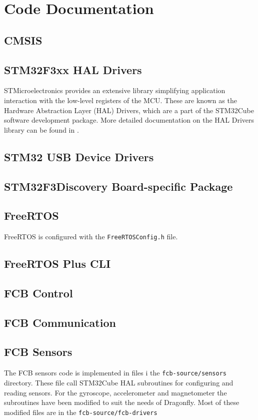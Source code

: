 \documentclass[a4paper]{report}
\begin{document}
	\section{Code Documentation}

		\subsection{CMSIS}

		\subsection{STM32F3xx HAL Drivers}
STMicroelectronics provides an extensive library simplifying application interaction with the low-level registers of the MCU. These are known as the Hardware Abstraction Layer (HAL) Drivers, which are a part of the STM32Cube software development package. More detailed documentation on the HAL Drivers library can be found in \cite{stm32f3haldrivers}.

		\subsection{STM32 USB Device Drivers}

		\subsection{STM32F3Discovery Board-specific Package}

		\subsection{FreeRTOS}
FreeRTOS is configured with the \texttt{FreeRTOSConfig.h} file.
		\subsection{FreeRTOS Plus CLI}

		\subsection{FCB Control}

		\subsection{FCB Communication}

		\subsection{FCB Sensors}
The FCB sensors code is implemented in files i the \texttt{fcb-source/sensors} directory. These file call STM32Cube HAL subroutines for configuring and reading sensors. For the gyroscope, accelerometer and magnetometer the subroutines have been modified to suit the needs of Dragonfly. Most of these modified files are in the \texttt{fcb-source/fcb-drivers}
\end{document}

